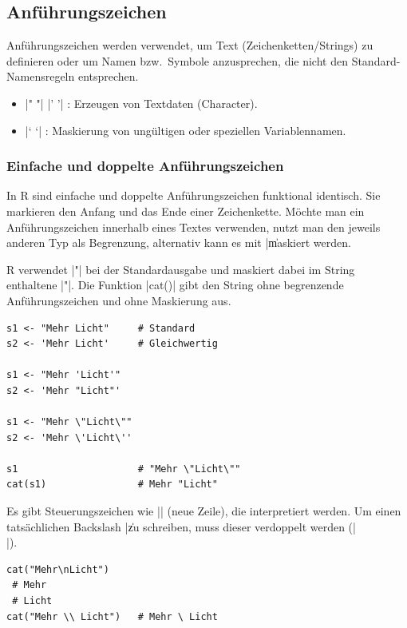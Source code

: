 \documentclass[10pt,twocolumn]{scrartcl}
\renewcommand{\lstinline}{\mycoloredinline}
\begin{document}
\subsection{Anführungszeichen}

Anführungszeichen werden verwendet, um Text (Zeichenketten/Strings) zu definieren oder um Namen bzw.\ Symbole anzusprechen, die nicht den Standard-Namensregeln entsprechen.

\begin{itemize}
\item \lstinline|" "| \lstinline|' '| : Erzeugen von Textdaten (Character).
\item \lstinline|` `| : Maskierung von ungültigen oder speziellen Variablennamen.
\end{itemize}

\subsubsection{Einfache und doppelte Anführungszeichen}

In R sind einfache und doppelte Anführungszeichen funktional identisch. Sie markieren den Anfang und das Ende einer Zeichenkette. Möchte man ein Anführungszeichen innerhalb eines Textes verwenden, nutzt man den jeweils anderen Typ als Begrenzung, alternativ kann es mit \lstinline|\| maskiert werden.

R verwendet \lstinline|"| bei der Standardausgabe und maskiert dabei im String enthaltene \lstinline|"|. Die Funktion \lstinline|cat()| gibt den String ohne begrenzende Anführungszeichen und ohne Maskierung aus.

\begin{lstlisting}
s1 <- "Mehr Licht"     # Standard
s2 <- 'Mehr Licht'     # Gleichwertig

s1 <- "Mehr 'Licht'"
s2 <- 'Mehr "Licht"'

s1 <- "Mehr \"Licht\""
s2 <- 'Mehr \'Licht\''

s1                     # "Mehr \"Licht\""
cat(s1)                # Mehr "Licht"
\end{lstlisting}

Es gibt Steuerungszeichen wie \lstinline|\n| (neue Zeile), die interpretiert werden. Um einen tatsächlichen Backslash \lstinline|\| zu schreiben, muss dieser verdoppelt werden (\lstinline|\\|).

\begin{lstlisting}
cat("Mehr\nLicht")
 # Mehr
 # Licht
cat("Mehr \\ Licht")   # Mehr \ Licht
\end{lstlisting}
\end{document}
